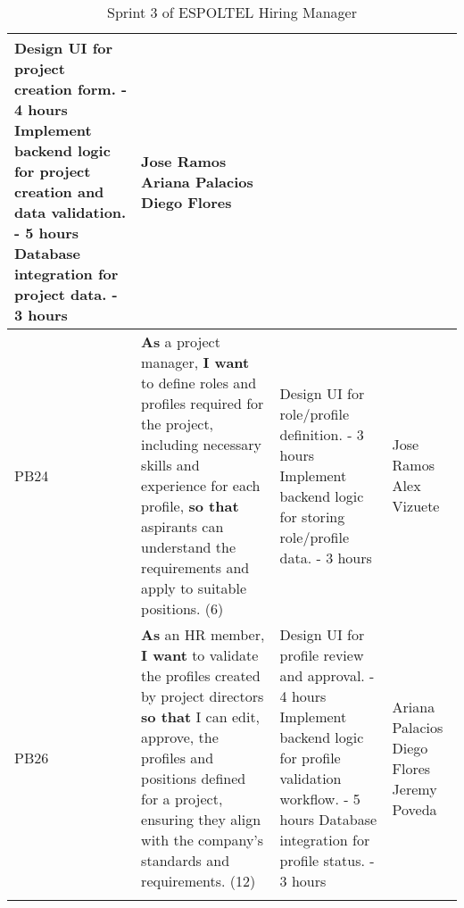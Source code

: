 \documentclass{scrreprt}
\begin{document}
\begin{longtable}{|p{1.5cm}|p{5.5cm}|p{4.5cm}|p{3cm}|}
	Design UI for project creation form. - 4 hours \newline
	Implement backend logic for project creation and data validation. - 5 hours \newline
	Database integration for project data. - 3 hours &
	Jose Ramos \newline
	Ariana Palacios \newline
	Diego Flores \\ \hline
	
	PB24 & \textbf{As} a project manager, \textbf{I want} to define roles and profiles required for the project, including necessary skills and experience for each profile, \textbf{so that} aspirants can understand the requirements and apply to suitable positions. (6) &
	
	Design UI for role/profile definition. - 3 hours \newline
	Implement backend logic for storing role/profile data. - 3 hours &
	Jose Ramos \newline
	Alex Vizuete \\ \hline
	
	PB26 & \textbf{As} an HR member, \textbf{I want} to validate the profiles created by project directors \textbf{so that} I can edit, approve, the profiles and positions defined for a project, ensuring they align with the company's standards and requirements. (12) &
	
	Design UI for profile review and approval. - 4 hours \newline
	Implement backend logic for profile validation workflow. - 5 hours \newline
	Database integration for profile status. - 3 hours &
	Ariana Palacios \newline
	Diego Flores \newline
	Jeremy Poveda \\ \hline
	
	\caption{Sprint 3 of ESPOLTEL Hiring Manager}
\end{longtable}
\end{document}
